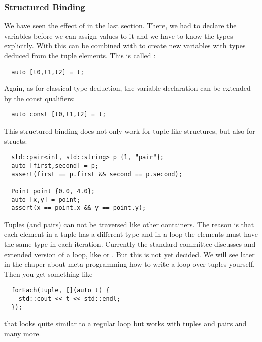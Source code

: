 \subsubsection{Structured Binding}
We have seen the effect of  in the last section. There, we had to declare the variables before we can assign
values to it and we have to know the types explicitly. With\marginpar{[\cxx{17}]}  this can be combined with 
to create new variables with types deduced from the tuple elements. This is called :
%
\begin{verbatim}
  auto [t0,t1,t2] = t;
\end{verbatim}
%
Again, as for classical  type deduction, the variable declaration can be extended by the const
qualifiers:
%
\begin{verbatim}
  auto const [t0,t1,t2] = t;
\end{verbatim}


This structured binding does not only work for tuple-like structures, but also for structs:
%
\begin{verbatim}
  std::pair<int, std::string> p {1, "pair"};
  auto [first,second] = p;
  assert(first == p.first && second == p.second);

  Point point {0.0, 4.0};
  auto [x,y] = point;
  assert(x == point.x && y == point.y);
\end{verbatim}

\begin{rem}
Tuples (and pairs) can not be traversed like other containers. The reason is that each element in a tuple has a different type and in a loop the elements must have the same type in each iteration. Currently the standard committee discusses and extended version of a loop, like  or . But this is not yet decided. We will see later in the chaper about meta-programming how to write a loop over tuples yourself. Then you get something like
\begin{verbatim}
  forEach(tuple, [](auto t) {
    std::cout << t << std::endl;
  });
\end{verbatim}
that looks quite similar to a regular loop but works with tuples and pairs and many more.
\end{rem}
